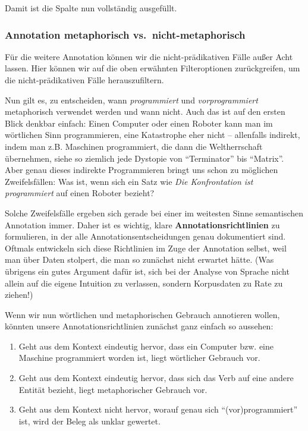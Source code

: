 \documentclass[]{article}
\begin{document}
Damit ist die Spalte nun vollständig ausgefüllt.

\subsubsection{Annotation metaphorisch
vs.~nicht-metaphorisch}\label{annotation-metaphorisch-vs.nicht-metaphorisch}

Für die weitere Annotation können wir die nicht-prädikativen Fälle außer
Acht lassen. Hier können wir auf die oben erwähnten Filteroptionen
zurückgreifen, um die nicht-prädikativen Fälle herauszufiltern.

Nun gilt es, zu entscheiden, wann \emph{programmiert} und
\emph{vorprogrammiert} metaphorisch verwendet werden und wann nicht.
Auch das ist auf den ersten Blick denkbar einfach: Einen Computer oder
einen Roboter kann man im wörtlichen Sinn programmieren, eine
Katastrophe eher nicht -- allenfalls indirekt, indem man z.B. Maschinen
programmiert, die dann die Weltherrschaft übernehmen, siehe so ziemlich
jede Dystopie von \enquote{Terminator} bis \enquote{Matrix}. Aber genau
dieses indirekte Programmieren bringt uns schon zu möglichen
Zweifelsfällen: Was ist, wenn sich ein Satz wie \emph{Die Konfrontation
ist programmiert} auf einen Roboter bezieht?

Solche Zweifelsfälle ergeben sich gerade bei einer im weitesten Sinne
semantischen Annotation immer. Daher ist es wichtig, klare
\textbf{Annotationsrichtlinien} zu formulieren, in der alle
Annotationsentscheidungen genau dokumentiert sind. Oftmals entwickeln
sich diese Richtlinien im Zuge der Annotation selbst, weil man über
Daten stolpert, die man so zunächst nicht erwartet hätte. (Was übrigens
ein gutes Argument dafür ist, sich bei der Analyse von Sprache nicht
allein auf die eigene Intuition zu verlassen, sondern Korpusdaten zu
Rate zu ziehen!)

Wenn wir nun wörtlichen und metaphorischen Gebrauch annotieren wollen,
könnten unsere Annotationsrichtlinien zunächst ganz einfach so aussehen:

\begin{enumerate}
\def\labelenumi{\arabic{enumi}.}
\item
  Geht aus dem Kontext eindeutig hervor, dass ein Computer bzw. eine
  Maschine programmiert worden ist, liegt wörtlicher Gebrauch vor.
\item
  Geht aus dem Kontext eindeutig hervor, dass sich das Verb auf eine
  andere Entität bezieht, liegt metaphorischer Gebrauch vor.
\item
  Geht aus dem Kontext nicht hervor, worauf genau sich
  \enquote{(vor)programmiert} ist, wird der Beleg als unklar gewertet.
\end{enumerate}
\end{document}
